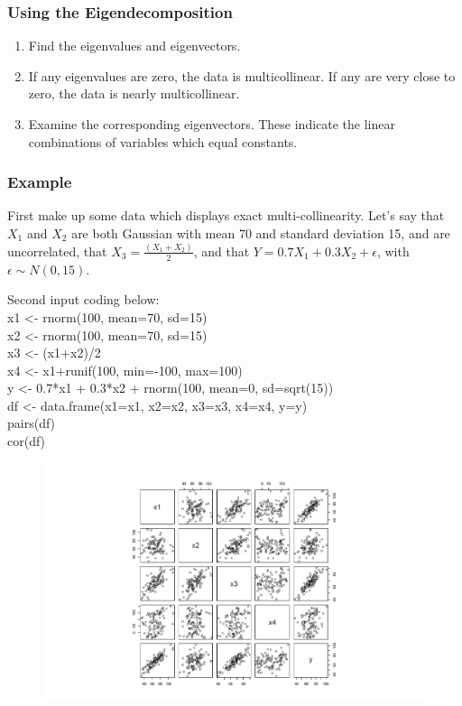 \documentclass{beamer}
\begin{document}
\begin{frame}
\frametitle{Using the Eigendecomposition}
\begin{enumerate}
\item Find the eigenvalues and eigenvectors. 
\item If any eigenvalues are zero, the data is multicollinear. 
If any are very close to zero, the data is nearly multicollinear. 
\item Examine the corresponding eigenvectors. These indicate the 
linear combinations of variables which equal constants. 
\end{enumerate}
\end{frame}

\begin{frame}
\frametitle{Example}
First make up some data which displays exact multi-collinearity. Let's say that
$X_1$ and $X_2$ are both Gaussian with mean 70 and standard deviation 15, and are
uncorrelated, that $X_3=\frac{(X_1+X_2)}{2}$, and that $Y=0.7X_1+0.3X_2+\epsilon$, with $\epsilon\sim N(0,15)$.
\end{frame}

\begin{frame}
Second input coding below: \\
x1 <- rnorm(100, mean=70, sd=15) \\
x2 <- rnorm(100, mean=70, sd=15)  \\
x3 <- (x1+x2)/2  \\
x4 <- x1+runif(100, min=-100, max=100)  \\
y <- 0.7*x1 + 0.3*x2 + rnorm(100, mean=0, sd=sqrt(15))  \\
df <- data.frame(x1=x1, x2=x2, x3=x3, x4=x4, y=y)  \\
pairs(df)\\
cor(df)
\end{frame}

\begin{frame}
\begin{figure}[h]
\begin{center}
\includegraphics[scale=0.3]{pairsplot}
\end{center}
\end{figure}
\end{frame}
\end{document}
